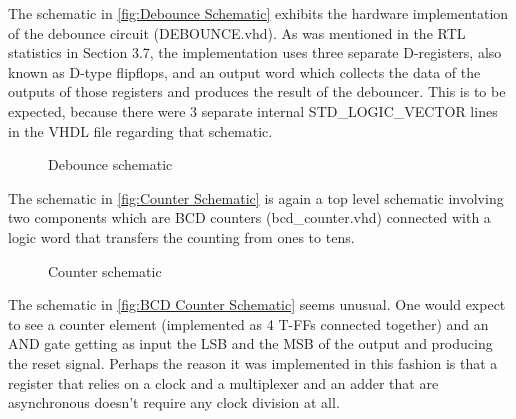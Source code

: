 \documentclass[10pt]{article}
\begin{document}
The schematic in \autoref{fig:Debounce Schematic} exhibits the hardware implementation of the debounce circuit (DEBOUNCE.vhd). As was mentioned in the RTL statistics in Section 3.7, the implementation uses three separate D-registers, also known as D-type flipflops, and an output word which collects the data of the outputs of those registers and produces the result of the debouncer.
This is to be expected, because there were 3 separate internal STD\_LOGIC\_VECTOR lines in the VHDL file regarding that schematic.

\begin{figure}[ht]
    \centering
    \caption{Debounce schematic}
    \label{fig:Debounce Schematic}
\end{figure}

\newpage

The schematic in \autoref{fig:Counter Schematic} is again a top level schematic involving two components which are BCD counters (bcd\_counter.vhd) connected with a logic word that transfers the counting from ones to tens.

\begin{figure}[ht]
    \centering
    \caption{Counter schematic}
    \label{fig:Counter Schematic}
\end{figure}

The schematic in \autoref{fig:BCD Counter Schematic} seems unusual. One would expect to see a counter element (implemented as 4 T-FFs connected together) and an AND gate getting as input the LSB and the MSB of the output and producing the reset signal.
Perhaps the reason it was implemented in this fashion is that a register that relies on a clock and a multiplexer and an adder that are asynchronous doesn't require any clock division at all. 
\end{document}
